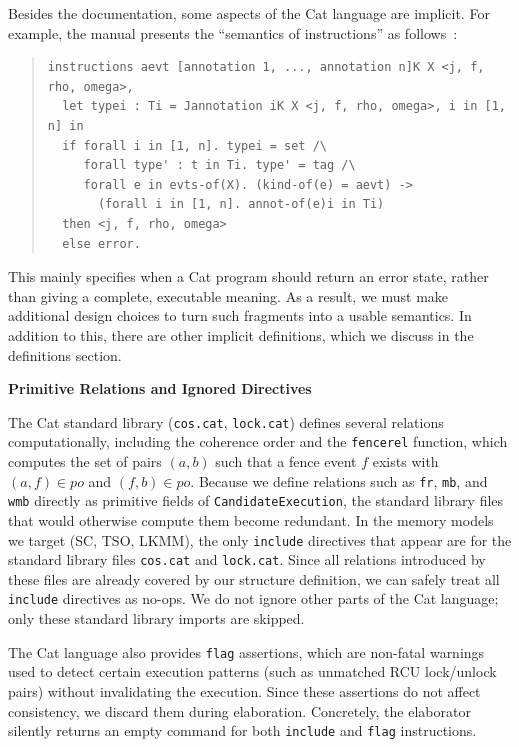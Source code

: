 Besides the documentation, some aspects of the Cat language are implicit. For example, the manual presents the ``semantics of instructions'' as follows~\citep{catManualSyntax11}:
\begin{quote}\small
\begin{verbatim}
instructions aevt [annotation 1, ..., annotation n]K X <j, f, rho, omega>,
  let typei : Ti = Jannotation iK X <j, f, rho, omega>, i in [1, n] in
  if forall i in [1, n]. typei = set /\
     forall type' : t in Ti. type' = tag /\
     forall e in evts-of(X). (kind-of(e) = aevt) ->
       (forall i in [1, n]. annot-of(e)i in Ti)
  then <j, f, rho, omega>
  else error.
\end{verbatim}
\end{quote}
This mainly specifies when a Cat program should return an error state, rather than giving a complete, executable meaning. As a result, we must make additional design choices to turn such fragments into a usable semantics. In addition to this, there are other implicit definitions, which we discuss in the definitions section.

\textbf{Primitive Relations and Ignored Directives}

The Cat standard library (\texttt{cos.cat}, \texttt{lock.cat}) defines several relations computationally, including the coherence order and the \texttt{fencerel} function, which computes the set of pairs $(a, b)$ such that a fence event $f$ exists with $(a, f) \in \mathit{po}$ and $(f, b) \in \mathit{po}$. Because we define relations such as \texttt{fr}, \texttt{mb}, and \texttt{wmb} directly as primitive fields of \texttt{CandidateExecution}, the standard library files that would otherwise compute them become redundant. In the memory models we target (SC, TSO, LKMM), the only \texttt{include} directives that appear are for the standard library files \texttt{cos.cat} and \texttt{lock.cat}. Since all relations introduced by these files are already covered by our structure definition, we can safely treat all \texttt{include} directives as no-ops. We do not ignore other parts of the Cat language; only these standard library imports are skipped.

The Cat language also provides \texttt{flag} assertions, which are non-fatal warnings used to detect certain execution patterns (such as unmatched RCU lock/unlock pairs) without invalidating the execution. Since these assertions do not affect consistency, we discard them during elaboration. Concretely, the elaborator silently returns an empty command for both \texttt{include} and \texttt{flag} instructions.

